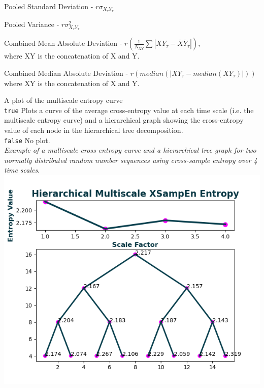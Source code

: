 \documentclass[12pt, a4paper, titlepage, openany]{book}
\begin{document}
\begin{description}[labelsep=1cm, labelwidth=2cm, nosep, style=multiline,leftmargin=3cm]
\begin{description}[labelsep=5em, labelwidth=4em, nosep,style=multiline,leftmargin=2cm]
		\item[1]    Pooled Standard Deviation          - $r\sigma_{X_{\tau}Y_{\tau}}$
        \item[2]    Pooled Variance                    - $r\sigma_{X_{\tau}Y_{\tau}}^2$
        \item[3]    Combined Mean Absolute Deviation     - $r(\frac{1}{N_{XY}} \sum |XY_{\tau} - \bar{X}\bar{Y}_{\tau}|),$ \\ where XY is the concatenation of X and Y.
        \item[4]    Combined Median Absolute Deviation   - $r(median(|XY_{\tau} - median(XY_{\tau})|)) $  \\ where XY is the concatenation of X and Y.
	\end{description} 
\item[\texttt{Plotx}]		A plot of the multiscale entropy curve\\
		\texttt{true} \hspace{15pt} Plots a curve of the average cross-entropy value at each time scale (i.e. the multiscale entropy curve) and a hierarchical graph showing the cross-entropy value of each node in the hierarchical tree decomposition.\\
							\texttt{false}\hspace{12pt} No plot.\\ 
		\textit{Example of a multiscale cross-entropy curve and a hierarchical tree graph for two normally distributed random number sequences using cross-sample entropy over 4 time scales}.\\
							\includegraphics[scale=.65]{hXMSEn1.png}
\end{description}
\end{document}
